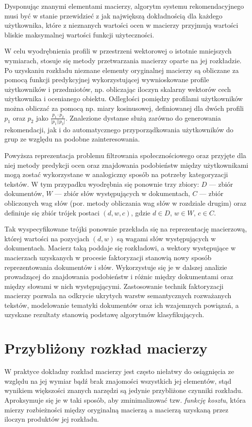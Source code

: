 \documentclass{pracamgr}
\newcommand{\abs}[1]{\lvert#1\rvert}
\begin{document}
Dysponując znanymi elementami macierzy, algorytm systemu rekomendacyjnego musi być w stanie przewidzieć z jak największą dokładnością dla każdego użytkownika, które z nieznanych wartości ocen w macierzy przyjmują wartości bliskie maksymalnej wartości funkcji użyteczności. 

W celu wyodrębnienia profili w przestrzeni wektorowej o istotnie mniejszych wymiarach, stosuje się metody przetwarzania macierzy oparte na jej rozkładzie. Po uzyskaniu rozkładu nieznane elementy oryginalnej macierzy są obliczane za pomocą funkcji predykcyjnej wykorzystującej wywnioskowane profile użytkowników i przedmiotów, np. obliczając iloczyn skalarny wektorów cech użytkownika i ocenianego obiektu. Odległości pomiędzy profilami użytkowników można obliczać za pomocą np. miary kosinusowej, definiowanej dla dwóch profili $p_1$ oraz $p_2$ jako $\frac{p_1 \cdot p_2}{\abs{p_1} \abs{p_2}}$. Znalezione dystanse służą zarówno do generowania rekomendacji, jak i do automatycznego przyporządkowania użytkowników do grup ze względu na podobne zainteresowania.

Powyższa reprezentacja problemu filtrowania społecznościowego oraz przyjęte dla niej metody predykcji ocen oraz znajdowania podobieństw między użytkownikami mogą zostać wykorzystane w analogiczny sposób na potrzeby kategoryzacji tekstów. W tym przypadku wyodrębnia się ponownie trzy zbiory: $D$ --- zbiór dokumentów, $W$ --- zbiór słów występujących w dokumentach, $C$ --- zbiór obliczonych wag słów (por. metody obliczania wag słów w rozdziale drugim) oraz definiuje się zbiór trójek postaci $(d, w, c)$, gdzie $d \in D$, $w \in W$, $c \in C$.

Tak wyspecyfikowane trójki ponownie przekłada się na reprezentację macierzową, której wartości na pozycjach $(d, w)$ są wagami słów występujących w dokumentach. Macierz taką poddaje się rozkładowi, a wektory występujące w macierzach uzyskanych w procesie faktoryzacji stanowią nowy sposób reprezentowania dokumentów i słów. Wykorzystuje się je w dalszej analizie prowadzącej do znajdowania podobieństw i różnic między dokumentami oraz między słowami w nich występującymi. Zastosowanie technik faktoryzacji macierzy pozwala na odkrycie ukrytych warstw semantycznych rozważanych tekstów, modelowanie tematyki dokumentów oraz ich wzajemnych powiązań, a uzyskane rezultaty stanowią podstawę algorytmów klasyfikujących.

\section{Przybliżony rozkład macierzy} \label{matrix_approx}
W praktyce dokładny rozkład macierzy jest często niełatwy do osiągnięcia ze względu na jej wymiar bądź brak znajomości wszystkich jej elementów, stąd wynikiem większości znanych narzędzi są jedynie przybliżone czynniki rozkładu. Aproksymuje się je w taki sposób, aby zminimalizować tzw. \textit{funkcję kosztu}, która mierzy rozbieżności między oryginalną macierzą a macierzą uzyskaną przez iloczyn produktów jej rozkładu.
\end{document}
